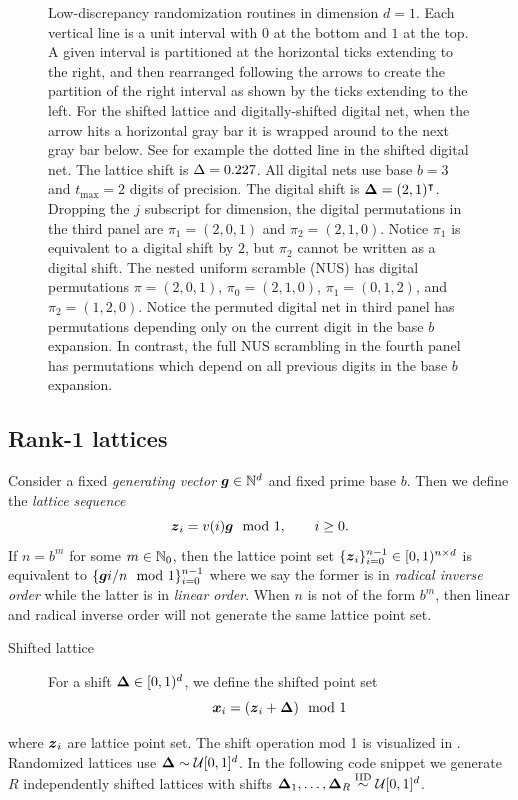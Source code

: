 \documentclass[acmsmall]{acmart}
\begin{document}
\begin{figure}
    \caption{Low-discrepancy randomization routines in dimension $d=1$. Each vertical line is a unit interval with $0$ at the bottom and $1$ at the top. A given interval is partitioned at the horizontal ticks extending to the right, and then rearranged following the arrows to create the partition of the right interval as shown by the ticks extending to the left. For the shifted lattice and digitally-shifted digital net, when the arrow hits a horizontal gray bar it is wrapped around to the next gray bar below. See for example the dotted line in the shifted digital net. The lattice shift is $\Delta = 0.227$. All digital nets use base $b=3$ and $t_\mathrm{max}=2$ digits of precision. The digital shift is ${\boldsymbol{\Delta}} = (2,1)^\intercal$. Dropping the $j$ subscript for dimension, the digital permutations in the third panel are $\pi_1 = (2,0,1)$ and $\pi_2 = (2,1,0)$. Notice $\pi_1$ is equivalent to a digital shift by $2$, but $\pi_2$ cannot be written as a digital shift. The nested uniform scramble (NUS) has digital permutations $\pi = (2,0,1)$, $\pi_0 = (2,1,0)$, $\pi_1 = (0,1,2)$, and $\pi_2 = (1,2,0)$. Notice the permuted digital net in third panel has permutations depending only on the current digit in the base $b$ expansion. In contrast, the full NUS scrambling in the fourth panel has permutations which depend on all previous digits in the base $b$ expansion.}
    \label{fig:ld_randomizations}
\end{figure}  

\subsection{Rank-1 lattices}

Consider a fixed \emph{generating vector} ${\boldsymbol{g}} \in {\mathbb{N}}^d$ and fixed prime base $b$. Then we define the \emph{lattice sequence} 
$${\boldsymbol{z}}_i = v(i) {\boldsymbol{g}} \mod 1, \qquad i \geq 0.$$
If $n=b^m$ for some $m \in {\mathbb{N}}_0$, then the lattice point set $\{{\boldsymbol{z}}_i\}_{i=0}^{n-1}\in [0,1)^{n \times d}$ is equivalent to $\{{\boldsymbol{g}} i/n \mod 1\}_{i=0}^{n-1}$ where we say the former is in \emph{radical inverse order} while the latter is in \emph{linear order}. When $n$ is not of the form $b^m$, then linear and radical inverse order will not generate the same lattice point set. 

\begin{description}
    \item[Shifted lattice] For a shift ${\boldsymbol{\Delta}} \in [0,1)^d$, we define the shifted point set 
    $${\boldsymbol{x}}_i= ({\boldsymbol{z}}_i + {\boldsymbol{\Delta}}) \mod 1$$ 
\end{description}
where ${\boldsymbol{z}}_i$ are lattice point set. The shift operation mod 1 is visualized in . Randomized lattices use ${\boldsymbol{\Delta}} \sim {\mathcal{U}}[0,1]^d$. In the following code snippet we generate $R$ independently shifted lattices with shifts ${\boldsymbol{\Delta}}_1,\dots,{\boldsymbol{\Delta}}_R \overset{\mathrm{IID}}{\sim} {\mathcal{U}}[0,1]^d$. 
\end{document}
